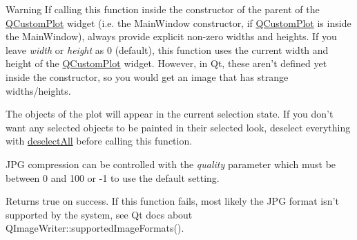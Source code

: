 \begin{DoxyWarning}{Warning}
If calling this function inside the constructor of the parent of the \hyperlink{classQCustomPlot}{Q\-Custom\-Plot} widget (i.\-e. the Main\-Window constructor, if \hyperlink{classQCustomPlot}{Q\-Custom\-Plot} is inside the Main\-Window), always provide explicit non-\/zero widths and heights. If you leave {\itshape width} or {\itshape height} as 0 (default), this function uses the current width and height of the \hyperlink{classQCustomPlot}{Q\-Custom\-Plot} widget. However, in Qt, these aren't defined yet inside the constructor, so you would get an image that has strange widths/heights.
\end{DoxyWarning}
The objects of the plot will appear in the current selection state. If you don't want any selected objects to be painted in their selected look, deselect everything with \hyperlink{classQCustomPlot_a9d4808ab925b003054085246c92a257c}{deselect\-All} before calling this function.

J\-P\-G compression can be controlled with the {\itshape quality} parameter which must be between 0 and 100 or -\/1 to use the default setting.

Returns true on success. If this function fails, most likely the J\-P\-G format isn't supported by the system, see Qt docs about Q\-Image\-Writer\-::supported\-Image\-Formats().

